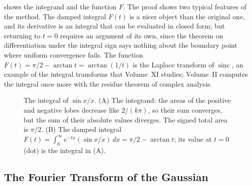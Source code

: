  shows the integrand and the function $F$. The proof shows two typical features of the method. The damped integral $F(t)$ is a nicer object than the original one, and its derivative is an integral that can be evaluated in closed form; but returning to $t=0$ requires an argument of its own, since the theorem on differentiation under the integral sign says nothing about the boundary point where uniform convergence fails. The function $F(t)=\pi/2-\arctan t=\arctan(1/t)$ is the Laplace transform of $\operatorname{sinc}$, an example of the integral transforms that Volume~XI studies; Volume~II computes the integral once more with the residue theorem of complex analysis.

\begin{figure}
\hfill
{}
\caption{The integral of $\sin x/x$. (A) The integrand: the areas of the positive and negative lobes decrease like $2/(k\pi)$, so their sum converges, but the sum of their absolute values diverges. The signed total area is $\pi/2$. (B) The damped integral $F(t)=\int_0^\infty e^{-tx}(\sin x/x)\,dx=\pi/2-\arctan t$; its value at $t=0$ (dot) is the integral in (A).}
\label{fig:sinc}
\end{figure}

\subsection{The Fourier Transform of the Gaussian}

